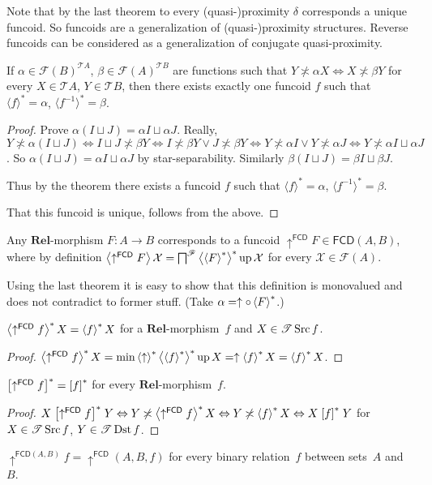 Note that by the last theorem to every (quasi-)proximity $\delta$ corresponds
a unique funcoid. So funcoids are a generalization of (quasi-)proximity
structures. Reverse funcoids can be considered as a generalization
of conjugate quasi-proximity.
\begin{cor}
If $\alpha\in\mathscr{F}(B)^{\mathscr{T}A}$,
$\beta\in\mathscr{F}(A)^{\mathscr{T}B}$
are functions such that $Y\nasymp\alpha X\Leftrightarrow X\nasymp\beta Y$
for every $X\in\mathscr{T}A$, $Y\in\mathscr{T}B$, then there exists
exactly one funcoid $f$ such that $\langle f\rangle^{\ast}=\alpha$,
$\langle f^{-1}\rangle^{\ast}=\beta$.\end{cor}
\begin{proof}
Prove $\alpha(I\sqcup J)=\alpha I\sqcup\alpha J$. Really,
$Y\nasymp\alpha(I\sqcup J)\Leftrightarrow I\sqcup J\nasymp\beta Y\Leftrightarrow
I\nasymp\beta Y\vee J\nasymp\beta Y\Leftrightarrow Y\nasymp\alpha I\vee
Y\nasymp\alpha J\Leftrightarrow Y\nasymp\alpha I\sqcup\alpha J$.
So $\alpha(I\sqcup J)=\alpha I\sqcup\alpha J$ by star-separability.
Similarly $\beta(I\sqcup J)=\beta I\sqcup\beta J$.

Thus by the theorem there exists a funcoid $f$ such that $\langle
f\rangle^{\ast}=\alpha$,
$\langle f^{-1}\rangle^{\ast}=\beta$.

That this funcoid is unique, follows from the above.\end{proof}
\begin{defn}
Any $\mathbf{Rel}$-morphism $F:A\rightarrow B$ corresponds to a
funcoid $\uparrow^{\mathsf{FCD}}F\in\mathsf{FCD}(A,B)$, where by
definition
$\left\langle \uparrow^{\mathsf{FCD}}F\right\rangle\mathcal{X}=\bigsqcap^{\mathscr{F}}\left\langle 
\left\langle F\right\rangle ^{\ast}\right\rangle ^{\ast}\operatorname{up}\mathcal{X}$
for every $\mathcal{X}\in\mathscr{F}(A)$.
\end{defn}
Using the last theorem it is easy to show that this definition is
monovalued and does not contradict to former stuff. (Take
$\alpha=\uparrow\circ\left\langle F\right\rangle ^{\ast}$.)
\begin{prop}
$\left\langle \uparrow^{\mathsf{FCD}}f\right\rangle ^{\ast}X=\left\langle f\right\rangle ^{\ast}X$ for a
$\mathbf{Rel}$-morphism~$f$
and $X\in\mathscr{T}\operatorname{Src} f$.\end{prop}
\begin{proof}
$\left\langle \uparrow^{\mathsf{FCD}}f\right\rangle ^{\ast}X=\min\left\langle \uparrow\right\rangle ^{\ast}\left\langle \left\langle f\right\rangle ^{\ast}\right\rangle ^{\ast}\operatorname{up} X=\uparrow\left\langle f\right\rangle ^{\ast}X=\left\langle f\right\rangle ^{\ast}X$.\end{proof}
\begin{cor}
$\mathord{\mathrel{\left[\uparrow^{\mathsf{FCD}}f\right]^{\ast}}}=\mathord{\mathrel{\left[f\right]^{\ast}}}$
for every $\mathbf{Rel}$-morphism~$f$.\end{cor}
\begin{proof}
$X\mathrel{\left[\uparrow^{\mathsf{FCD}}f\right]^{\ast}}Y\Leftrightarrow
Y\not\asymp\left\langle \uparrow^{\mathsf{FCD}}f\right\rangle ^{\ast}X\Leftrightarrow Y\not\asymp\left\langle f\right\rangle ^{\ast}X\Leftrightarrow X\mathrel{\left[f\right]^{\ast}}Y$
for $X\in\mathscr{T}\operatorname{Src} f$, $Y\in\mathscr{T}\operatorname{Dst} f$.\end{proof}
\begin{defn}
$\uparrow^{\mathsf{FCD}(A,B)}f=\uparrow^{\mathsf{FCD}}(A,B,f)$ for
every binary relation~$f$ between sets~$A$ and~$B$.
\end{defn}

